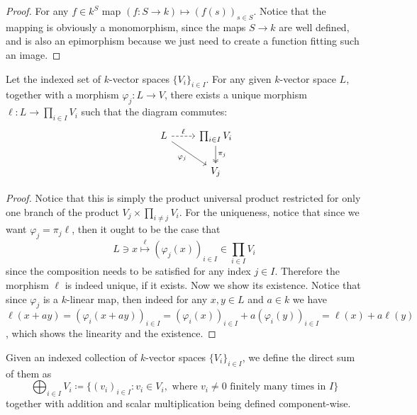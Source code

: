 \begin{proof}
    For any \(f \in k^S\) map \((f : S \to k) \mapsto (f(s))_{s \in S}\). Notice
    that the mapping is obviously a monomorphism, since the maps \(S \to k\) are
    well defined, and is also an epimorphism because we just need to create
    a function fitting such an image.
\end{proof}

\begin{proposition}
    Let the indexed set of \(k\)-vector spaces \(\{V_i\}_{i \in I}\). For any
    given \(k\)-vector space \(L\), together with a morphism \(\varphi_j : L \to
    V\), there exists a unique morphism \(\ell : L \to \prod_{i \in I} V_i\) such
    that the diagram commutes:
    \[
        \begin{tikzcd}
            &L
            \ar[r, dashed, "\ell"]
            \ar[dr, swap, "\varphi_j"]
            &\prod_{i \in I} V_i
            \ar[d, "\pi_j", two heads] \\
            &
            &V_j
        \end{tikzcd}
    \]
\end{proposition}

\begin{proof}
    Notice that this is simply the product universal product restricted for only
    one branch of the product \(V_j \times \prod_{i \neq j} V_i\). For the
    uniqueness, notice that since we want \(\varphi_j = \pi_j  \ell\), then
    it ought to be the case that
    \[
        L \ni x \overset{\ell}\longmapsto (\varphi_j(x))_{i \in I} \in \prod_{i
            \in I} V_i
    \]
    since the composition needs to be satisfied for any index \(j \in I\).
    Therefore the morphism \(\ell\) is indeed unique, if it exists. Now we show
    its existence. Notice that since \(\varphi_j\) is a \(k\)-linear map, then
    indeed for any \(x, y \in L\) and \(a \in k\) we have \(\ell(x + ay) =
    (\varphi_i(x + ay))_{i \in I} = (\varphi_i(x))_{i \in I} + a
    (\varphi_i(y))_{i \in I} = \ell(x) + a \ell(y)\), which shows the linearity
    and the existence.
\end{proof}

\begin{definition}
    Given an indexed collection of \(k\)-vector spaces \(\{V_i\}_{i \in I}\), we
    define the direct sum of them as
    \[
        \bigoplus _{i \in I} V_i \coloneq \{(v_i)_{i \in I} \colon v_i \in V_i, \text{ where
        } v_i \neq 0 \text{ finitely many times in } I\}
    \]
    together with addition and scalar multiplication being defined component-wise.
\end{definition}

